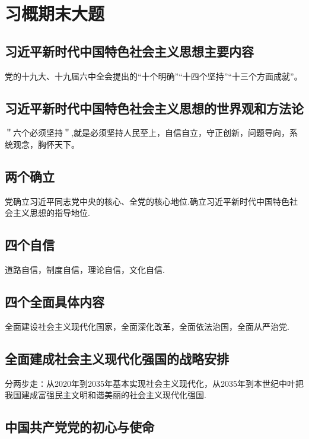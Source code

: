 \documentclass[12pt, a4paper, oneside]{ctexbook}
\begin{document}
\chapter{习概期末大题}

\section{习近平新时代中国特色社会主义思想主要内容}

党的十九大、十九届六中全会提出的“十个明确”“十四个坚持”“十三个方面成就”。

\section{习近平新时代中国特色社会主义思想的世界观和方法论}

＂六个必须坚持＂,就是必须坚持人民至上，自信自立，守正创新，问题导向，系统观念，胸怀天下。

\section{两个确立}

党确立习近平同志党中央的核心、全党的核心地位.确立习近平新时代中国特色社会主义思想的指导地位.


\section{四个自信}

道路自信，制度自信，理论自信，文化自信.


\section{四个全面具体内容}

全面建设社会主义现代化国家，全面深化改革，全面依法治国，全面从严治党.

\section{全面建成社会主义现代化强国的战略安排}

分两步走∶从2020年到2035年基本实现社会主义现代化，从2035年到本世纪中叶把我国建成富强民主文明和谐美丽的社会主义现代化强国.

\section{中国共产党党的初心与使命}
\end{document}
